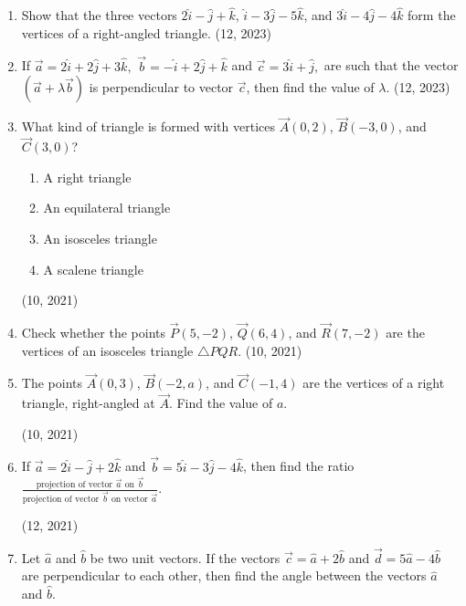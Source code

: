 \begin{enumerate}[label=\thesubsection.\arabic*, ref=\thesubsection.\theenumi]
    \item Show that the three vectors $2\hat{i} - \hat{j} + \hat{k}$, $\hat{i} - 3\hat{j} - 5\hat{k}$, and $3\hat{i} - 4\hat{j} - 4\hat{k}$ form the vertices of a right-angled triangle. 
    \hfill (12, 2023)
    \item If
      $  \overrightarrow{a} = 2\hat{i} + 2\hat{j} + 3\hat{k},$
      $  \overrightarrow{b} = -\hat{i} + 2\hat{j} + \hat{k} $
      and
      $  \overrightarrow{c} = 3\hat{i} + \hat{j},            $
    are such that the vector $(\overrightarrow{a} + \lambda \overrightarrow{b})$ is perpendicular to vector $\overrightarrow{c}$, then find the value of $\lambda$.
    \hfill (12, 2023)
		\item What kind of triangle is formed with vertices $\vec{A}(0, 2)$, $\vec{B}(-3, 0)$, and $\vec{C}(3, 0)$?
		\begin{enumerate}
			\item A right triangle
			\item An equilateral triangle
			\item An isosceles triangle
			\item A scalene triangle
		\end{enumerate}
		\hfill (10, 2021)
		\item Check whether the points $\vec{P}(5, -2)$, $\vec{Q}(6, 4)$, and $\vec{R}(7, -2)$ are the vertices of an isosceles triangle $\triangle PQR$. \hfill (10, 2021)
		\item The points $\vec{A}(0, 3)$, $\vec{B}(-2, a)$, and $\vec{C}(-1, 4)$ are the vertices of a right triangle, right-angled at $\vec{A}$. Find the value of $a$.

			\hfill (10, 2021)
	\item If $\vec{a} = 2\hat{i} - \hat{j} + 2\hat{k}$ and $\vec{b} = 5\hat{i} - 3\hat{j} - 4\hat{k}$, then find the ratio $\frac{\text{projection of vector } \vec{a} \text{ on } \vec{b}}{\text{projection of vector } \vec{b} \text{ on vector } \vec{a}}$. 

		\hfill (12, 2021)
	\item Let $\hat{a}$ and $\hat{b}$ be two unit vectors. If the vectors $\vec{c} = \hat{a} + 2\hat{b}$ and $\vec{d} = 5\hat{a} - 4\hat{b}$ are perpendicular to each other, then find the angle between the vectors $\hat{a}$ and $\hat{b}$.


\end{enumerate}
